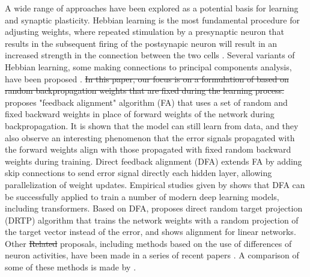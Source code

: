 A wide range of approaches have been explored as a potential basis for learning and synaptic plasticity. Hebbian learning is the most fundamental procedure for adjusting weights, where
repeated stimulation by a presynaptic neuron that results in the subsequent
firing of the postsynapic neuron will result in an increased strength in the connection
between the two cells \citep{hebb1,paulsen}. Several variants of Hebbian learning, some making connections to principal components analysis, have been proposed
\citep{oja,sejnowski1,sejnowski2}. 
\sout{In this paper, our focus is on a formulation of \mbox{\cite{lillicrap2016random}} based on random backpropagation weights that are fixed during the learning process.}
{\color{red}
\cite{lillicrap2016random} proposes "feedback alignment" algorithm (FA) that uses a set of random and fixed backward weights in place of forward weights of the network during backpropagation. It is shown that the model can still learn from data, and they also observe an interesting phenomenon that the error signals propagated with the forward weights align with those propagated with fixed random backward weights during training. Direct feedback alignment (DFA) \citep{nokland2016direct} extends FA by adding skip connections to send error signal directly each hidden layer, allowing parallelization of weight updates. Empirical studies given by \citet{launay2020direct} shows that DFA can be successfully applied to train a number of modern deep learning models, including transformers. Based on DFA, \citet{frenkel2021learning} proposes direct random target projection (DRTP) algorithm that trains the network weights with a random projection of the target vector instead of the error, and shows alignment for linear networks. Other
}
\sout{Related} 
proposals, including methods based on the use of differences of neuron activities, have been made in a series of recent papers \citep{akrout,bellec,lillicrap2020backpropagation}. A comparison of some of these methods is made by \cite{bartunov}.


